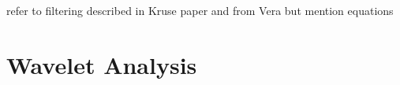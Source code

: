 refer to filtering described in Kruse paper and from Vera
but mention equations

\section{Wavelet Analysis}



